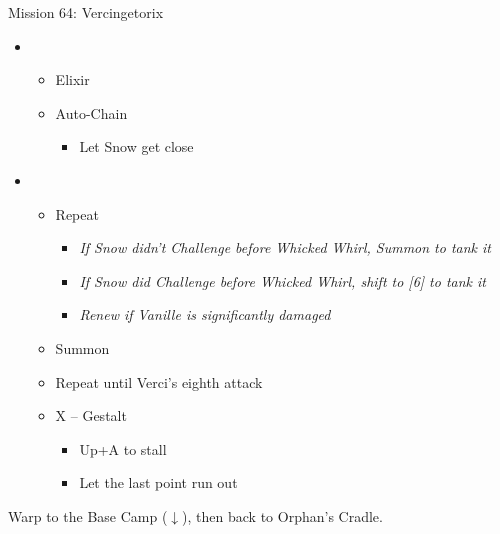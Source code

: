 \begin{battle}{Mission 64: Vercingetorix}
\begin{itemize}
		\item \third
			\begin{itemize}
				\item Elixir
				\item Auto-Chain
					\begin{itemize}
						\item Let Snow get close
					\end{itemize}
			\end{itemize}
		\item \second
			\begin{itemize}
				\item Repeat
					\begin{itemize}
						\item \textit{If Snow didn't Challenge before Whicked Whirl, Summon to tank it}
						\item \textit{If Snow did Challenge before Whicked Whirl, shift to [6] to tank it}
						\item \textit{Renew if Vanille is significantly damaged}
					\end{itemize}
				\item Summon
				\item Repeat until Verci's eighth attack
				\item X -- Gestalt
					\begin{itemize}
						\item Up+A to stall
						\item Let the last point run out
					\end{itemize}
			\end{itemize}
	\end{itemize}
\end{battle}

Warp to the Base Camp ($\downarrow$), then back to Orphan's Cradle.
\vfill
\ 
\columnbreak